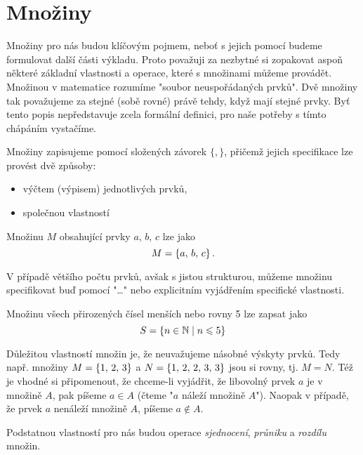 \section{Množiny}

Množiny pro nás budou klíčovým pojmem, neboť s jejich pomocí budeme formulovat další části výkladu. Proto považuji za nezbytné si zopakovat aspoň některé základní vlastnosti a operace, které s množinami můžeme provádět. Množinou v matematice rozumíme "soubor neuspořádaných prvků". Dvě množiny tak považujeme za stejné (sobě rovné) právě tehdy, když mají stejné prvky. Byť tento popis nepředstavuje zcela formální definici, pro naše potřeby s tímto chápáním vystačíme.\par
Množiny zapisujeme pomocí složených závorek $\{,\}$, přičemž jejich specifikace lze provést dvě způsoby:
\begin{itemize}
    \item výčtem (výpisem) jednotlivých prvků,
    \item společnou vlastností
\end{itemize}

\begin{example}
    Množinu $M$ obsahující prvky $a,\,b,\,c$ lze jako
    \begin{equation*}
        M=\left\{a,\,b,\,c\right\}.
    \end{equation*}
\end{example}
V případě většího počtu prvků, avšak s jistou strukturou, můžeme množinu specifikovat buď pomocí "\dots" nebo explicitním vyjádřením specifické vlastnosti.

\begin{example}
    Množinu všech přirozených čísel menších nebo rovny 5 lze zapsat jako
    \begin{equation*}
        S=\left\{n\in\mathbb{N} \;\middle\vert\; n \leqslant 5\right\}
    \end{equation*}
\end{example}

Důležitou vlastností množin je, že neuvažujeme násobné výskyty prvků. Tedy např. množiny $M=\left\{1,\,2,\,3\right\}$ a $N=\left\{1,\,2,\,2,\,3,\,3\right\}$ jsou si rovny, tj. $M=N$. Též je vhodné si připomenout, že chceme-li vyjádřit, že libovolný prvek $a$ je v množině $A$, pak píšeme $a \in A$ (čteme "$a$ náleží množině $A$"). Naopak v případě, že prvek $a$ nenáleží množině $A$, píšeme $a \notin A$.\par
Podstatnou vlastností pro nás budou operace \emph{sjednocení}, \emph{průniku} a \emph{rozdílu} množin.

